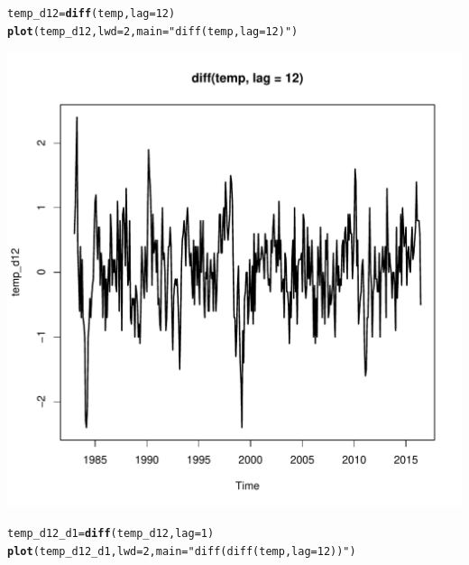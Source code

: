 \documentclass[10pt]{article}\usepackage[]{graphicx}\usepackage[]{color}
\makeatletter
\def\maxwidth{ %
  \ifdim\Gin@nat@width>\linewidth
    \linewidth
  \else
    \Gin@nat@width
  \fi
}
\newcommand{\hlnum}[1]{\textcolor[rgb]{0.686,0.059,0.569}{#1}}%
\newcommand{\hlstr}[1]{\textcolor[rgb]{0.192,0.494,0.8}{#1}}%
\newcommand{\hlstd}[1]{\textcolor[rgb]{0.345,0.345,0.345}{#1}}%
\newcommand{\hlkwb}[1]{\textcolor[rgb]{0.69,0.353,0.396}{#1}}%
\newcommand{\hlkwc}[1]{\textcolor[rgb]{0.333,0.667,0.333}{#1}}%
\newcommand{\hlkwd}[1]{\textcolor[rgb]{0.737,0.353,0.396}{\textbf{#1}}}%
\newenvironment{kframe}{%
 \def\at@end@of@kframe{}%
 \ifinner\ifhmode%
  \def\at@end@of@kframe{\end{minipage}}%
  \begin{minipage}{\columnwidth}%
 \fi\fi%
 \def\FrameCommand##1{\hskip\@totalleftmargin \hskip-\fboxsep
 \colorbox{shadecolor}{##1}\hskip-\fboxsep
     \hskip-\linewidth \hskip-\@totalleftmargin \hskip\columnwidth}%
 \MakeFramed {\advance\hsize-\width
   \@totalleftmargin\z@ \linewidth\hsize
   \@setminipage}}%
 {\par\unskip\endMakeFramed%
 \at@end@of@kframe}
\newenvironment{knitrout}{}{} %
\makeatother
\begin{document}
\begin{knitrout}
\color{fgcolor}\begin{kframe}
\begin{alltt}
\hlstd{temp_d12} \hlkwb{=} \hlkwd{diff}\hlstd{(temp,} \hlkwc{lag} \hlstd{=} \hlnum{12}\hlstd{)}
\hlkwd{plot}\hlstd{(temp_d12,}\hlkwc{lwd} \hlstd{=} \hlnum{2}\hlstd{,} \hlkwc{main} \hlstd{=} \hlstr{"diff(temp, lag = 12)"}\hlstd{)}
\end{alltt}
\end{kframe}
\includegraphics[width=\maxwidth]{figure/unnamed-chunk-25-1} 
\begin{kframe}\begin{alltt}
\hlstd{temp_d12_d1} \hlkwb{=} \hlkwd{diff}\hlstd{(temp_d12,} \hlkwc{lag} \hlstd{=} \hlnum{1}\hlstd{)}
\hlkwd{plot}\hlstd{(temp_d12_d1,}\hlkwc{lwd} \hlstd{=} \hlnum{2}\hlstd{,} \hlkwc{main} \hlstd{=} \hlstr{"diff(diff(temp, lag = 12))"}\hlstd{)}
\end{alltt}
\end{kframe}

\end{knitrout}
\end{document}

